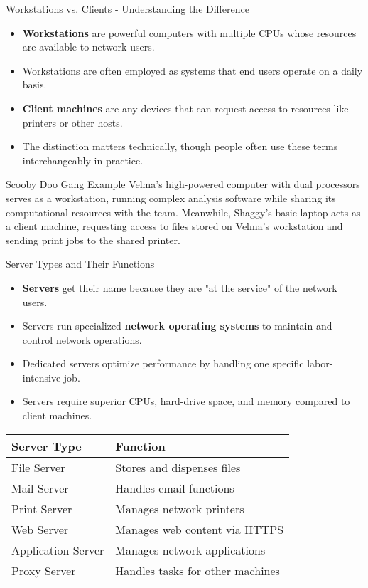 \documentclass[aspectratio=169]{beamer}
\begin{document}
	\begin{frame}{Workstations vs. Clients - Understanding the Difference}
		\begin{itemize}
			\item \textbf{Workstations} are powerful computers with multiple CPUs whose resources are available to network users.
			\item Workstations are often employed as systems that end users operate on a daily basis.
			\item \textbf{Client machines} are any devices that can request access to resources like printers or other hosts.
			\item The distinction matters technically, though people often use these terms interchangeably in practice.
		\end{itemize}
		
		\begin{exampleblock}{Scooby Doo Gang Example}
			Velma's high-powered computer with dual processors serves as a workstation, running complex analysis software while sharing its computational resources with the team. Meanwhile, Shaggy's basic laptop acts as a client machine, requesting access to files stored on Velma's workstation and sending print jobs to the shared printer.
		\end{exampleblock}
	\end{frame}
	
	\begin{frame}{Server Types and Their Functions}
		\begin{itemize}
			\item \textbf{Servers} get their name because they are "at the service" of the network users.
			\item Servers run specialized \textbf{network operating systems} to maintain and control network operations.
			\item Dedicated servers optimize performance by handling one specific labor-intensive job.
			\item Servers require superior CPUs, hard-drive space, and memory compared to client machines.
		\end{itemize}
		
		\begin{center}
			\begin{tabular}{ll}
				\toprule
				\textbf{Server Type} & \textbf{Function} \\
				\midrule
				File Server & Stores and dispenses files \\
				Mail Server & Handles email functions \\
				Print Server & Manages network printers \\
				Web Server & Manages web content via HTTPS \\
				Application Server & Manages network applications \\
				Proxy Server & Handles tasks for other machines \\
				\bottomrule
			\end{tabular}
		\end{center}
	\end{frame}
	
\end{document}
